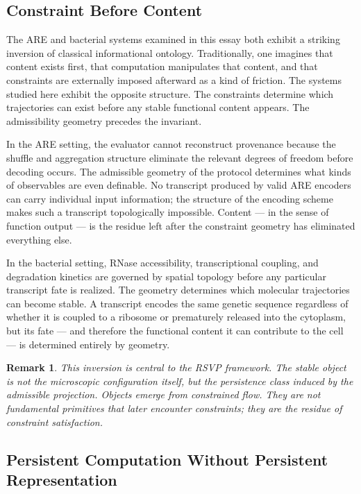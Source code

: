 \documentclass[12pt, a4paper]{article}
\theoremstyle{essaystyle}
\newtheorem*{remark}{Remark}
\begin{document}
\subsection{Constraint Before Content}

The ARE and bacterial systems examined in this essay both exhibit a striking inversion
of classical informational ontology. Traditionally, one imagines that content exists
first, that computation manipulates that content, and that constraints are externally
imposed afterward as a kind of friction. The systems studied here exhibit the opposite
structure. The constraints determine which trajectories can exist before any stable
functional content appears. The admissibility geometry precedes the invariant.

In the ARE setting, the evaluator cannot reconstruct provenance because the shuffle and
aggregation structure eliminate the relevant degrees of freedom before decoding occurs.
The admissible geometry of the protocol determines what kinds of observables are even
definable. No transcript produced by valid ARE encoders can carry individual input
information; the structure of the encoding scheme makes such a transcript
topologically impossible. Content --- in the sense of function output --- is the
residue left after the constraint geometry has eliminated everything else.

In the bacterial setting, RNase accessibility, transcriptional coupling, and degradation
kinetics are governed by spatial topology before any particular transcript fate is
realized. The geometry determines which molecular trajectories can become stable. A
transcript encodes the same genetic sequence regardless of whether it is coupled to a
ribosome or prematurely released into the cytoplasm, but its fate --- and therefore the
functional content it can contribute to the cell --- is determined entirely by geometry.

\begin{remark}
This inversion is central to the RSVP framework. The stable object is not the
microscopic configuration itself, but the persistence class induced by the admissible
projection. Objects emerge from constrained flow. They are not fundamental primitives
that later encounter constraints; they are the residue of constraint satisfaction.
\end{remark}

\subsection{Persistent Computation Without Persistent Representation}
\end{document}

